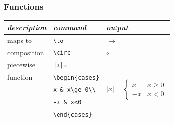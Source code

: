 \documentclass{article} %
\begin{document}
    \subsubsection{Functions}
        \begin{center}
        \begin{tabular}{l|l|l}
        \emph{description} & \emph{command} & \emph{output}\\ \hline
        maps to & \verb!\to! & $\to$\\
        composition& \verb!\circ! & $\circ$\\
        piecewise& \verb!|x|=! & \multirow{5}{*}{$\displaystyle |x|=\begin{cases}x&x\ge 0\\-x&x<0\end{cases}$}\\
        function&\verb!\begin{cases}!&\\ 
        &\verb!x & x\ge 0\\!&\\ 
        &\verb!-x & x<0!&\\ 
        &\verb!\end{cases}!&
        \end{tabular}
        \end{center}
\end{document}

